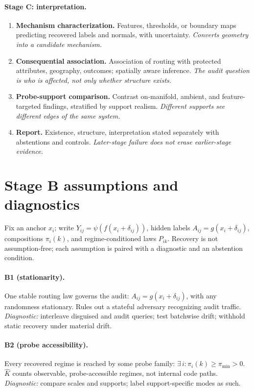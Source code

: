 \documentclass[11pt]{article}
\begin{document}
\paragraph{Stage C: interpretation.}
\begin{enumerate}[label=\textbf{C\arabic*.},leftmargin=2.7em]
  \item \textbf{Mechanism characterization.} Features, thresholds, or boundary maps
  predicting recovered labels and normals, with uncertainty. \emph{Converts geometry into a
  candidate mechanism.}
  \item \textbf{Consequential association.} Association of routing with protected
  attributes, geography, outcomes; spatially aware inference. \emph{The audit question is
  who is affected, not only whether structure exists.}
  \item \textbf{Probe-support comparison.} Contrast on-manifold, ambient, and
  feature-targeted findings, stratified by support realism. \emph{Different supports see
  different edges of the same system.}
  \item \textbf{Report.} Existence, structure, interpretation stated separately with
  abstentions and controls. \emph{Later-stage failure does not erase earlier-stage
  evidence.}
\end{enumerate}

\section{Stage B assumptions and diagnostics}
\label{sec:assumptions}

Fix an anchor \(x_i\); write \(Y_{ij}=\psi(f(x_i+\delta_{ij}))\), hidden labels
\(A_{ij}=g(x_i+\delta_{ij})\), compositions \(\pi_i(k)\), and regime-conditioned laws
\(P_{ik}\). Recovery is not assumption-free; each assumption is paired with a diagnostic and
an abstention condition.

\paragraph{B1 (stationarity).} One stable routing law governs the audit:
\(A_{ij}=g(x_i+\delta_{ij})\), with any randomness stationary. Rules out a stateful
adversary recognizing audit traffic. \emph{Diagnostic:} interleave disguised and audit
queries; test batchwise drift; withhold static recovery under material drift.

\paragraph{B2 (probe accessibility).} Every recovered regime is reached by some probe family:
\(\exists\,i:\pi_i(k)\ge\pi_{\min}>0\). \(\widehat K\) counts observable, probe-accessible
regimes, not internal code paths. \emph{Diagnostic:} compare scales and supports; label
support-specific modes as such.
\end{document}
